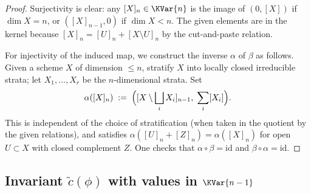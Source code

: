 \begin{proof}
  Surjectivity is clear: any \([X]_n \in \KVar{n}\) is the image of \((0, [X])\) if
  \(\dim X = n\), or \(([X]_{n-1}, 0)\) if \(\dim X < n\).  The given elements are
  in the kernel because \([X]_n = [U]_n + [X \setminus U]_n\) by the cut-and-paste
  relation.

  For injectivity of the induced map, we construct the inverse \(\alpha\) of
  \(\beta\) as follows.  Given a scheme \(X\) of dimension \(\leq n\), stratify \(X\)
  into locally closed irreducible strata; let \(X_1, \ldots, X_r\) be the
  \(n\)-dimensional strata.  Set
  \[
    \alpha([X]_n) \;:=\;
    \Bigl([X \setminus \bigsqcup_i X_i]_{n-1},\; \sum_i [X_i]\Bigr).
  \]
  This is independent of the choice of stratification (when taken in the quotient
  by the given relations), and satisfies \(\alpha([U]_n + [Z]_n) = \alpha([X]_n)\)
  for open \(U \subset X\) with closed complement \(Z\).  One checks that
  \(\alpha \circ \beta = \mathrm{id}\) and \(\beta \circ \alpha = \mathrm{id}\).
\end{proof}

\subsection{Invariant \texorpdfstring{\(\tilde{c}(\phi)\)}{c-tilde(phi)} with values in \texorpdfstring{\(\KVar{n-1}\)}{K0(Var<=n-1/k)}}


